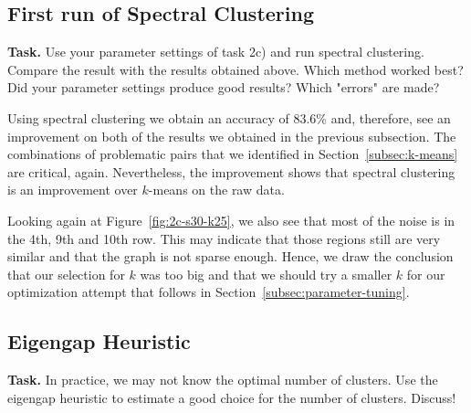 \documentclass{support/acm_proc_article-sp}
\begin{document}
    \subsection{First run of Spectral Clustering}
    \label{subsec:spectral-clustering}

    \textbf{Task.} Use your parameter settings of task 2c) and run spectral clustering.
    Compare the result with the results obtained above.
    Which method worked best?
    Did your parameter settings produce good results?
    Which "errors" are made?

    Using spectral clustering we obtain an accuracy of $83.6\%$ and, therefore, see an improvement on both of the results
    we obtained in the previous subsection.
    The combinations of problematic pairs that we identified in Section~\ref{subsec:k-means} are critical, again.
    Nevertheless, the improvement shows that spectral clustering is an improvement over $k$-means on the raw
    data.

    Looking again at Figure~\ref{fig:2c-s30-k25}, we also see that most of the noise is in the 4th, 9th and 10th
    row.
    This may indicate that those regions still are very similar and that the graph is not sparse enough.
    Hence, we draw the conclusion that our selection for $k$ was too big and that we should try a smaller $k$
    for our optimization attempt that follows in Section~\ref{subsec:parameter-tuning}.


    \subsection{Eigengap Heuristic}

    \textbf{Task.} In practice, we may not know the optimal number of clusters.
    Use the eigengap heuristic to estimate a good choice for the number of clusters.
    Discuss!
\end{document}
